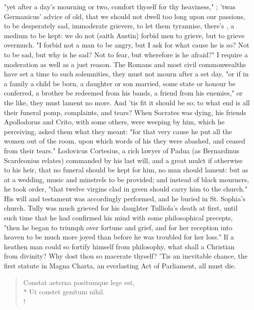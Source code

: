 {"yet after a day's mourning or two, comfort thyself for thy heaviness,"  ; 'twas Germanicus' advice of old, that we should not dwell too long upon our passions, to be desperately sad, immoderate grievers, to let them tyrannise, there's , a medium to be kept: we do not (saith Austin) forbid men to grieve, but to grieve overmuch. "I forbid not a man to be angry, but I ask for what cause he is so? Not to be sad, but why is he sad? Not to fear, but wherefore is he afraid?" I require a moderation as well as a just reason. The Romans and most civil commonwealths have set a time to such solemnities, they must not mourn after a set day, "or if in a family a child be born, a daughter or son married, some state or honour be conferred, a brother be redeemed from his bands, a friend from his enemies," or the like, they must lament no more. And 'tis fit it should be so; to what end is all their funeral pomp, complaints, and tears? When Socrates was dying, his friends Apollodorus and Crito, with some others, were weeping by him, which he perceiving, asked them what they meant: "for that very cause he put all the women out of the room, upon which words of his they were abashed, and ceased from their tears." Lodovicus Cortesius, a rich lawyer of Padua (as Bernardinus Scardeonius relates) commanded by his last will, and a great mulct if otherwise to his heir, that no funeral should be kept for him, no man should lament: but as at a wedding, music and minstrels to be provided; and instead of black mourners, he took order, "that twelve virgins clad in green should carry him to the church." His will and testament was accordingly performed, and he buried in St. Sophia's church. Tully was much grieved for his daughter Tulliola's death at first, until such time that he had confirmed his mind with some philosophical precepts, "then he began to triumph over fortune and grief, and for her reception into heaven to be much more joyed than before he was troubled for her loss." If a heathen man could so fortify himself from philosophy, what shall a Christian from divinity? Why dost thou so macerate thyself? 'Tis an inevitable chance, the first statute in Magna Charta, an everlasting Act of Parliament, all must die.

\begin{latin}
\begin{verse}%
Constat aeterna positumque lege est,\\*
Ut constet genitum nihil.\\!
\end{verse}%
\end{latin}
%

}
